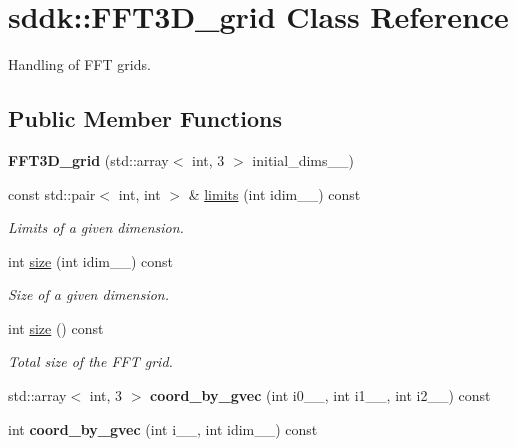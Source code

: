 \hypertarget{classsddk_1_1_f_f_t3_d__grid}{}\section{sddk\+:\+:F\+F\+T3\+D\+\_\+grid Class Reference}
\label{classsddk_1_1_f_f_t3_d__grid}


Handling of F\+F\+T grids.  


\subsection*{Public Member Functions}
\begin{DoxyCompactItemize}
\item 
\hypertarget{classsddk_1_1_f_f_t3_d__grid_a3514e62914f358e77416ee3026db224d}{}{\bfseries F\+F\+T3\+D\+\_\+grid} (std\+::array$<$ int, 3 $>$ initial\+\_\+dims\+\_\+\+\_\+)\label{classsddk_1_1_f_f_t3_d__grid_a3514e62914f358e77416ee3026db224d}

\item 
const std\+::pair$<$ int, int $>$ \& \hyperlink{classsddk_1_1_f_f_t3_d__grid_a9f0e5f2d7e6aeac1704d08e7211306ec}{limits} (int idim\+\_\+\+\_\+) const 
\begin{DoxyCompactList}\small\item\em Limits of a given dimension. \end{DoxyCompactList}\item 
int \hyperlink{classsddk_1_1_f_f_t3_d__grid_a82d573aedf2570700518897978008a48}{size} (int idim\+\_\+\+\_\+) const 
\begin{DoxyCompactList}\small\item\em Size of a given dimension. \end{DoxyCompactList}\item 
int \hyperlink{classsddk_1_1_f_f_t3_d__grid_a6f1dc12129ff8afa69387a25dbc1d92d}{size} () const 
\begin{DoxyCompactList}\small\item\em Total size of the F\+F\+T grid. \end{DoxyCompactList}\item 
\hypertarget{classsddk_1_1_f_f_t3_d__grid_a1a65d3d3e00c39bb8c42095ebfa7abfd}{}std\+::array$<$ int, 3 $>$ {\bfseries coord\+\_\+by\+\_\+gvec} (int i0\+\_\+\+\_\+, int i1\+\_\+\+\_\+, int i2\+\_\+\+\_\+) const \label{classsddk_1_1_f_f_t3_d__grid_a1a65d3d3e00c39bb8c42095ebfa7abfd}

\item 
\hypertarget{classsddk_1_1_f_f_t3_d__grid_a45bed375f9900a5895ef59c456f35656}{}int {\bfseries coord\+\_\+by\+\_\+gvec} (int i\+\_\+\+\_\+, int idim\+\_\+\+\_\+) const \label{classsddk_1_1_f_f_t3_d__grid_a45bed375f9900a5895ef59c456f35656}


\end{DoxyCompactItemize}
